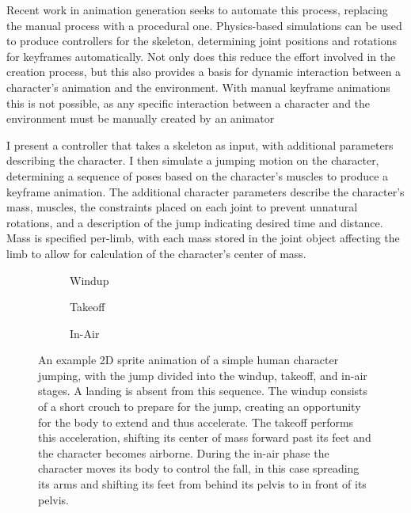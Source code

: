 Recent work in animation generation seeks to automate this process, replacing the manual process with a procedural one.  Physics-based simulations can be used to produce controllers for the skeleton, determining joint positions and rotations for keyframes automatically.  Not only does this reduce the effort involved in the creation process, but this also provides a basis for dynamic interaction between a character's animation and the environment.  With manual keyframe animations this is not possible, as any specific interaction between a character and the environment must be manually created by an animator 

I present a controller that takes a skeleton as input, with additional parameters describing the character.  I then simulate a jumping motion on the character, determining a sequence of poses based on the character's muscles to produce a keyframe animation.  The additional character parameters describe the character's mass, muscles, the constraints placed on each joint to prevent unnatural rotations, and a description of the jump indicating desired time and distance.  Mass is specified per-limb, with each mass stored in the joint object affecting the limb to allow for calculation of the character's center of mass.  

\newcommand{\frameimage}[1]{\fbox{\texttt{[image: \#1]}}}

\begin{figure}[htp]
	\centering
	\begin{subfigure}[h]{0.16\textwidth}
		\frameimage{images/jump_stages/ps1_windup.png}
		\caption{Windup}
	\end{subfigure}
	\begin{subfigure}[h]{0.32\textwidth}
		\frameimage{images/jump_stages/ps2_takeoff.png}
		\caption{Takeoff}
	\end{subfigure}
	\begin{subfigure}[h]{0.48\textwidth}
		\frameimage{images/jump_stages/ps3_airborne.png}
		\caption{In-Air}
	\end{subfigure}
	\caption[Example of stages of jumping]{An example 2D sprite animation of a simple human character jumping, with the jump divided into the windup, takeoff, and in-air stages.  A landing is absent from this sequence.  The windup consists of a short crouch to prepare for the jump, creating an opportunity for the body to extend and thus accelerate.  The takeoff performs this acceleration, shifting its center of mass forward past its feet and the character becomes airborne.  During the in-air phase the character moves its body to control the fall, in this case spreading its arms and shifting its feet from behind its pelvis to in front of its pelvis.}
	\label{fig:jumpStages}
\end{figure}

